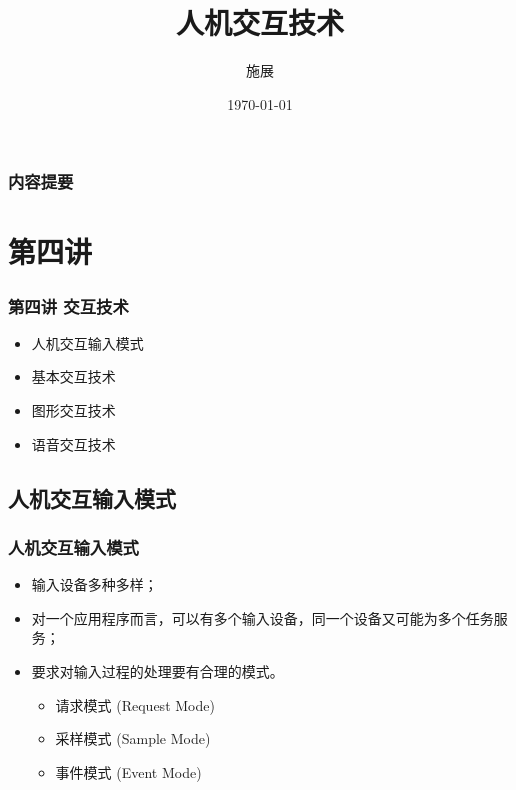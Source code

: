 \documentclass{beamer}
\title{人机交互技术}
\author{施展}
\institute{华中科技大学~武汉光电国家实验室}
\date{\today}
\begin{document}
\begin{frame}
	\titlepage
\end{frame}

\begin{frame}
	\frametitle{内容提要}
	\tableofcontents
\end{frame}

\section{第四讲}
\begin{frame}
	\frametitle{第四讲 交互技术}
	\begin{itemize}
		\item 人机交互输入模式
		\item 基本交互技术
		\item 图形交互技术
		\item 语音交互技术
	\end{itemize}
\end{frame}

\subsection{人机交互输入模式}
\begin{frame}
	\frametitle{人机交互输入模式}
	\beamertemplatetransparentcovereddynamicmedium
	\begin{itemize}[<+->]
		\item 输入设备多种多样；
		\item 对一个应用程序而言，可以有多个输入设备，同一个设备又可能为多个任务服务；
		\item 要求对输入过程的处理要有合理的模式。
		\begin{itemize}
			\item 请求模式 (Request Mode)
			\item 采样模式 (Sample Mode)
			\item 事件模式 (Event Mode)
		\end{itemize}
	\end{itemize}
\end{frame}
\end{document}

